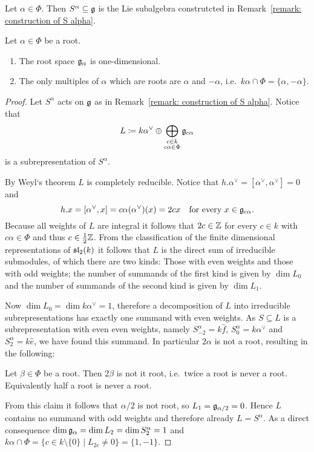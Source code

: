 \begin{defi}
 Let $\alpha \in \Phi$. Then $S^\alpha \subseteq \mathfrak{g}$ is the Lie subalgebra construtcted in Remark~\ref{remark: construction of S alpha}.
\end{defi}


\begin{prop}
 Let $\alpha \in \Phi$ be a root.
 \begin{enumerate}[leftmargin=*]
  \item
   The root space $\mathfrak{g}_\alpha$ is one-dimensional.
  \item
   The only multiples of $\alpha$ which are roots are $\alpha$ and $-\alpha$, i.e.\ $k\alpha \cap \Phi = \{\alpha, -\alpha\}$.
 \end{enumerate}
\end{prop}
\begin{proof}
 Let $S^\alpha$ acts on $\mathfrak{g}$ as in Remark~\ref{remark: construction of S alpha}. Notice that
 \[
  L \coloneqq k \alpha^\vee \oplus \bigoplus_{\substack{c \in k \\ c\alpha \in \Phi}} \mathfrak{g}_{c\alpha}
 \]
 is a subrepresentation of $S^\alpha$.
 
 By Weyl‘s theorem $L$ is completely reducible. Notice that $h.\alpha^\vee = [\alpha^\vee, \alpha^\vee] = 0$ and
 \[
  h.x = [\alpha^\vee, x] = c\alpha(\alpha^\vee)(x) = 2cx
  \quad \text{for every $x \in \mathfrak{g}_{c\alpha}$}.
 \]
 Because all weights of $L$ are integral it follows that $2c \in \mathbb{Z}$ for every $c \in k$ with $c\alpha \in \Phi$ and thus $c \in \frac{1}{2}\mathbb{Z}$. From the classification of the finite dimensional representations of $\mathfrak{sl}_2(k)$ it follows that $L$ is the direct sum of irreducible submodules, of which there are two kinds: Those with even weights and those with odd weights; the number of summands of the first kind is given by $\dim L_0$ and the number of summands of the second kind is given by $\dim L_1$.
 
 Now $\dim L_0 = \dim k\alpha^\vee = 1$, therefore a decomposition of $L$ into irreducible subrepresentations has exactly one summand with even weights. As $S \subseteq L$ is a subrepresentation with even even weights, namely $S^\alpha_{-2} = k\hat{f}$, $S^\alpha_0 = k\alpha^\vee$ and $S^\alpha_2 = k\hat{e}$, we have found this summand. In particular $2\alpha$ is not a root, resulting in the following:
 
 \begin{claim*}
  Let $\beta \in \Phi$ be a root. Then $2\beta$ is not it root, i.e.\ twice a root is never a root. Equivalently half a root is never a root.
 \end{claim*}
 
 From this claim it follows that $\alpha/2$ is not root, so $L_1 = \mathfrak{g}_{\alpha/2} = 0$. Hence $L$ contains no summand with odd weights and therefore already $L = S^\alpha$. As a direct consequence $\dim \mathfrak{g}_\alpha = \dim L_2 = \dim S^\alpha_2 = 1$ and $k\alpha \cap \Phi = \{c \in k \setminus \{0\} \mid L_{2c} \neq 0\} = \{1,-1\}$.
\end{proof}


